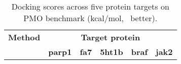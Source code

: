 \documentclass[lettersize,journal]{IEEEtran}
\begin{document}
\begin{table*}[t]
    \caption{Docking scores across five protein targets on PMO benchmark (kcal/mol, \textdownarrow\ better).}
    \label{tab:target_protein_scores}
    \centering
    \small %

    \begin{tabular}{l ccccc}
        \hline
        \textbf{Method} & \multicolumn{5}{c}{\textbf{Target protein}} \\ 
        \cline{2-6} %

        & \textbf{parp1} & \textbf{fa7} & \textbf{5ht1b} & \textbf{braf} & \textbf{jak2} \\
        \hline
        

\end{tabular}
\end{table*}
\end{document}
